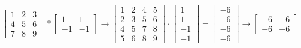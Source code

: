 \documentclass[12pt]{article}
\begin{document}
\[
\begin{bmatrix}
    1 & 2 & 3\\
    4 & 5 & 6\\
    7 & 8 & 9
\end{bmatrix} * \begin{bmatrix}
    1 & 1\\
    -1 & -1
\end{bmatrix} \rightarrow \begin{bmatrix}
   1 & 2 & 4 & 5\\ 
   2 & 3 & 5 & 6\\
   4 & 5 & 7 & 8\\
   5 & 6 & 8 & 9
\end{bmatrix} \cdot \begin{bmatrix}
    1\\
    1\\
    -1\\
    -1
\end{bmatrix} = \begin{bmatrix}
    -6\\
    -6\\
    -6\\
    -6
\end{bmatrix} \rightarrow \begin{bmatrix}
    -6 & -6\\
    -6 & -6
\end{bmatrix}
\]
\end{document}
